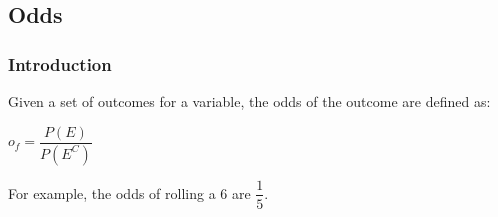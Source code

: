 
\subsection{Odds}

\subsubsection{Introduction}

Given a set of outcomes for a variable, the odds of the outcome are defined as:

\(o_f=\dfrac{P(E)}{P(E^C)}\)

For example, the odds of rolling a \(6\) are \(\dfrac{1}{5}\).

